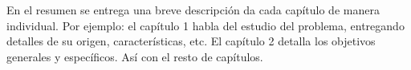 En el resumen se entrega una breve descripción da cada capítulo de manera individual. Por ejemplo: el capítulo 1 habla del estudio del problema, entregando detalles de su origen, características, etc. El capítulo 2 detalla los objetivos generales y específicos. Así con el resto de capítulos.
